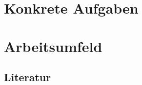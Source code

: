 \section{Konkrete Aufgaben}
\label{sec:konkrete_aufgaben}

\section{Arbeitsumfeld}
\label{sec:arbeitsumfeld}

  \subsection{Literatur}
  \label{ssec:literatur}
    \nocite{*}
    \printbibliography

